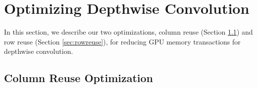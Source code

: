 \section{Optimizing Depthwise Convolution}
\label{sec:strategies} In this section, we describe our two optimizations, column reuse (Section \ref{sec:creuse}) and row reuse (Section \ref{sec:rowreuse}), for reducing GPU memory transactions for depthwise convolution. 

%
\subsection{Column Reuse Optimization}
\label{sec:creuse}

